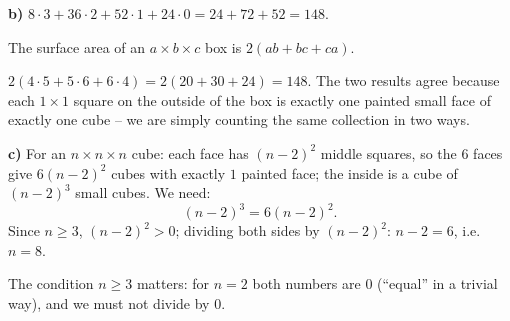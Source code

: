 {\textbf{b)}
$8\cdot 3+36\cdot 2+52\cdot 1+24\cdot 0=24+72+52=148$.
\begin{recallbox}The surface area of an $a\times b\times c$ box is $2(ab+bc+ca)$.\end{recallbox}
$2(4\cdot5+5\cdot6+6\cdot4)=2(20+30+24)=148$. The two results agree because each $1\times 1$ square on the outside
of the box is exactly one painted small face of exactly one cube -- we are simply counting the same collection in
two ways.

\textbf{c)}
For an $n\times n\times n$ cube: each face has $(n-2)^2$ middle squares, so the $6$ faces give $6(n-2)^2$ cubes
with exactly $1$ painted face; the inside is a cube of $(n-2)^3$ small cubes. We need:
\[ (n-2)^3=6(n-2)^2. \]
Since $n\ge 3$, $(n-2)^2>0$; dividing both sides by $(n-2)^2$: $n-2=6$, i.e.\ $n=8$.
\begin{warnbox}The condition $n\ge 3$ matters: for $n=2$ both numbers are $0$ (``equal'' in a trivial way), and we
must not divide by $0$.\end{warnbox}
}

